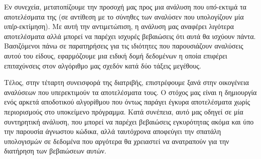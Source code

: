 Εν συνεχεία, μετατοπίζουμε την προσοχή μας προς μια ανάλυση που \emph{υπό}-εκτιμά τα αποτελέσματα της (σε αντίθεση με το σύνηθες των αναλύσεν που υπολογίζουν μία \emph{υπέρ}-εκτίμηση). Με αυτή την αντιμετώπιση, η ανάλυση μας αναφέρει λιγότερα αποτελέσματα αλλά μπορεί να παρέχει ισχυρές βεβαιώσεις ότι αυτά θα ισχύουν πάντα. Βασιζόμενοι πάνω σε παρατηρήσεις για τις ιδιότητες που παρουσιάζουν αναλύσεις αυτού του είδους, εφαρμόζουμε μια ειδική δομή δεδομένων η οποία επιφέρει επιταχύνσεις στον αλγόριθμο μας σχεδόν κατά δύο τάξεις μεγέθους.

Τέλος, στην τέταρτη συνεισφορά της διατριβής, επιστρέφουμε ξανά στην οικογένεια αναλύσεων που υπερεκτιμούν τα αποτελέσματα τους. Ο στόχος μας είναι η δημιουργία ενός αρκετά αποδοτικού αλγορίθμου που όντως παράγει έγκυρα αποτελέσματα χωρίς περιορισμούς στο υποκείμενο πρόγραμμα. Κατά συνέπεια, αυτό μας οδηγεί σε μία συντηρητική ανάλυση, που μπορεί να παρέχει βεβαιώσεις εγκυρότητας ακόμα και ύπο την παρουσία άγνωστου κώδικα, αλλά ταυτόχρονα αποφεύγει την σπατάλη υπολογισμών σε δεδομένα που αργότερα θα χρειαστεί να ανατραπούν για την διατήρηση των βεβαιώσεων αυτών.%